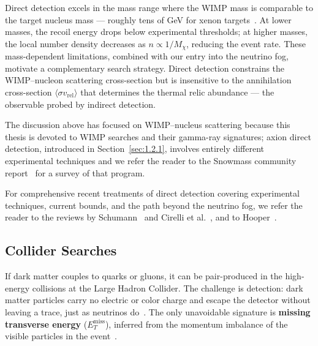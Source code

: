Direct detection excels in the mass range where the WIMP mass is comparable to the target nucleus mass --- roughly tens of GeV for xenon targets~\cite{Cirelli:2024ssz}.
At lower masses, the recoil energy drops below experimental thresholds; at higher masses, the local number density decreases as $n \propto 1/M_\chi$, reducing the event rate.
These mass-dependent limitations, combined with our entry into the neutrino fog, motivate a complementary search strategy.
Direct detection constrains the WIMP--nucleon scattering cross-section but is insensitive to the annihilation cross-section $\langle \sigma v_\mathrm{rel} \rangle$ that determines the thermal relic abundance --- the observable probed by indirect detection.

The discussion above has focused on WIMP--nucleus scattering because this thesis is devoted to WIMP searches and their gamma-ray signatures; axion direct detection, introduced in Section~\ref{sec:1.2.1}, involves entirely different experimental techniques and we refer the reader to the Snowmass community report~\cite{Adams:2022pbo} for a survey of that program.

For comprehensive recent treatments of direct detection covering experimental techniques, current bounds, and the path beyond the neutrino fog, we refer the reader to the reviews by Schumann~\cite{Schumann:2019eaa} and Cirelli et al.~\cite{Cirelli:2024ssz}, and to Hooper~\cite{Hooper:2024}.

\subsection{Collider Searches}
\label{sec:1.3.2}

If dark matter couples to quarks or gluons, it can be pair-produced in the high-energy collisions at the Large Hadron Collider.
The challenge is detection: dark matter particles carry no electric or color charge and escape the detector without leaving a trace, just as neutrinos do~\cite{Cirelli:2024ssz,Hooper:2024}.
The only unavoidable signature is \textbf{missing transverse energy} ($E_T^\text{miss}$), inferred from the momentum imbalance of the visible particles in the event~\cite{Cirelli:2024ssz}.

